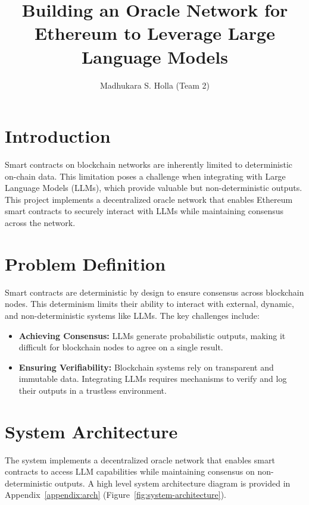 \documentclass[12pt]{article}
\begin{document}
\title{Building an Oracle Network for Ethereum to Leverage Large Language Models}
\author{Madhukara S. Holla (Team 2)}
\date{}
\maketitle

\section{Introduction}
Smart contracts on blockchain networks are inherently limited to deterministic on-chain data. This limitation poses a challenge when integrating with Large Language Models (LLMs), which provide valuable but non-deterministic outputs. This project implements a decentralized oracle network that enables Ethereum smart contracts to securely interact with LLMs while maintaining consensus across the network.

\section{Problem Definition}
Smart contracts are deterministic by design to ensure consensus across blockchain nodes. This determinism limits their ability to interact with external, dynamic, and non-deterministic systems like LLMs. The key challenges include:

\begin{itemize}
    \item \textbf{Achieving Consensus:} LLMs generate probabilistic outputs, making it difficult for blockchain nodes to agree on a single result.
    \item \textbf{Ensuring Verifiability:} Blockchain systems rely on transparent and immutable data. Integrating LLMs requires mechanisms to verify and log their outputs in a trustless environment.
\end{itemize}

\section{System Architecture}
The system implements a decentralized oracle network that enables smart contracts to access LLM capabilities while maintaining consensus on non-deterministic outputs. A high level system architecture diagram is provided in Appendix~\ref{appendix:arch} (Figure~\ref{fig:system-architecture}).
\end{document}
